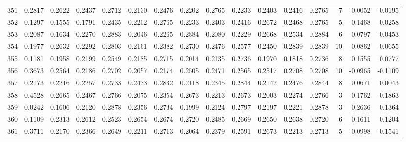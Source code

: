 \begin{tabular}{lrrrrrrrrrrrrrrr}
351 &      0.2817 &  0.2622 &  0.2437 &  0.2712 &  0.2130 &  0.2476 &  0.2202 &  0.2765 &  0.2233 &  0.2403 &   0.2416 &     0.2765 &      7 &                   -0.0052 &                    -0.0195 \\
352 &      0.1297 &  0.1555 &  0.1791 &  0.2435 &  0.2202 &  0.2765 &  0.2233 &  0.2403 &  0.2416 &  0.2672 &   0.2468 &     0.2765 &      5 &                    0.1468 &                     0.0258 \\
353 &      0.2087 &  0.1634 &  0.2270 &  0.2883 &  0.2046 &  0.2265 &  0.2884 &  0.2080 &  0.2229 &  0.2668 &   0.2534 &     0.2884 &      6 &                    0.0797 &                    -0.0453 \\
354 &      0.1977 &  0.2632 &  0.2292 &  0.2803 &  0.2161 &  0.2382 &  0.2730 &  0.2476 &  0.2577 &  0.2450 &   0.2839 &     0.2839 &     10 &                    0.0862 &                     0.0655 \\
355 &      0.1181 &  0.1958 &  0.2199 &  0.2549 &  0.2185 &  0.2715 &  0.2014 &  0.2135 &  0.2736 &  0.1970 &   0.1818 &     0.2736 &      8 &                    0.1555 &                     0.0777 \\
356 &      0.3673 &  0.2564 &  0.2186 &  0.2702 &  0.2057 &  0.2174 &  0.2505 &  0.2471 &  0.2565 &  0.2517 &   0.2708 &     0.2708 &     10 &                   -0.0965 &                    -0.1109 \\
357 &      0.2173 &  0.2216 &  0.2257 &  0.2733 &  0.2433 &  0.2832 &  0.2118 &  0.2345 &  0.2844 &  0.2142 &   0.2476 &     0.2844 &      8 &                    0.0671 &                     0.0043 \\
358 &      0.4528 &  0.2665 &  0.2467 &  0.2766 &  0.2075 &  0.2354 &  0.2673 &  0.2213 &  0.2673 &  0.2003 &   0.2274 &     0.2766 &      3 &                   -0.1762 &                    -0.1863 \\
359 &      0.0242 &  0.1606 &  0.2120 &  0.2878 &  0.2356 &  0.2734 &  0.1999 &  0.2124 &  0.2797 &  0.2197 &   0.2221 &     0.2878 &      3 &                    0.2636 &                     0.1364 \\
360 &      0.1109 &  0.2313 &  0.2612 &  0.2523 &  0.2654 &  0.2674 &  0.2720 &  0.2485 &  0.2669 &  0.2650 &   0.2638 &     0.2720 &      6 &                    0.1611 &                     0.1204 \\
361 &      0.3711 &  0.2170 &  0.2366 &  0.2649 &  0.2211 &  0.2713 &  0.2064 &  0.2379 &  0.2591 &  0.2673 &   0.2213 &     0.2713 &      5 &                   -0.0998 &                    -0.1541 \\

\end{tabular}
